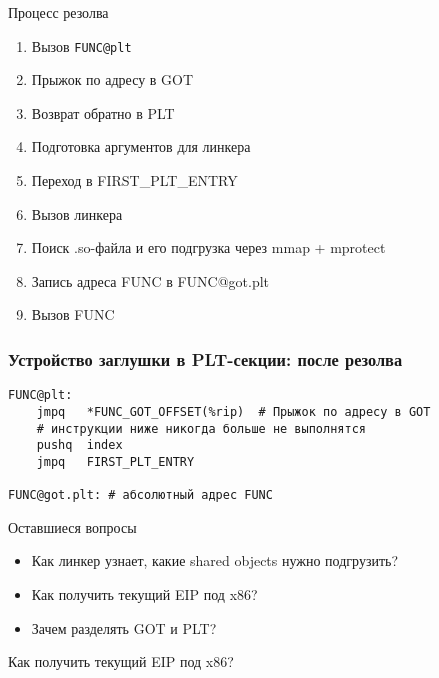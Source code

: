 \documentclass[10pt,pdf,hyperref={unicode}]{beamer}
\begin{document}
\begin{frame}{Процесс резолва}
\begin{enumerate}
    \item Вызов \texttt{FUNC@plt}
    \item Прыжок по адресу в GOT
    \item Возврат обратно в PLT
    \item Подготовка аргументов для линкера
    \item Переход в FIRST\_PLT\_ENTRY
    \item Вызов линкера
    \item Поиск .so-файла и его подгрузка через mmap + mprotect
    \item Запись адреса FUNC в FUNC@got.plt
    \item Вызов FUNC
\end{enumerate}
\end{frame}

\begin{frame}[fragile]
\frametitle{Устройство заглушки в PLT-секции: после резолва}
\begin{center}
    \begin{minipage}{0.95\textwidth}
        \begin{verbatim}
FUNC@plt:
    jmpq   *FUNC_GOT_OFFSET(%rip)  # Прыжок по адресу в GOT
    # инструкции ниже никогда больше не выполнятся
    pushq  index
    jmpq   FIRST_PLT_ENTRY

FUNC@got.plt: # абсолютный адрес FUNC
        \end{verbatim}
    \end{minipage}
\end{center}
\end{frame}

\begin{frame}{Оставшиеся вопросы}
\begin{itemize}
    \item Как линкер узнает, какие shared objects нужно подгрузить? 
    \item Как получить текущий EIP под x86?
    \item Зачем разделять GOT и PLT?
\end{itemize}
\end{frame}

\begin{frame}
\center\Huge{Как получить текущий EIP под x86?}
\end{frame}
\end{document}
